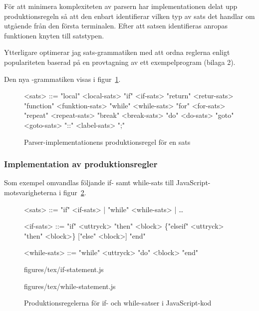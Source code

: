 För att minimera komplexiteten av parsern har implementationen delat upp
produktionsregeln  så att den enbart identifierar vilken typ av
sats det handlar om utgående från den första terminalen. Efter att satsen
identifieras anropas funktionen knyten till satstypen.

Ytterligare optimerar jag sats-grammatiken med att ordna reglerna enligt
populariteten baserad på en provtagning av ett exempelprogram (bilaga 2).

Den nya -grammatiken visas i figur~\ref{fig:stat}.

\begin{figure}[ht]
  \setlength{\grammarindent}{5em}
  \begin{grammar}
    \singlespace\small%
    \selectfont
    <sats> ::= "local" <local-sats>
      \alt "if" <if-sats>
      \alt "return" <retur-sats>
      \alt "function" <funktion-sats>
      \alt "while" <while-sats>
      \alt "for" <for-sats>
      \alt "repeat" <repeat-sats>
      \alt "break" <break-sats>
      \alt "do" <do-sats>
      \alt "goto" <goto-sats>
      \alt "::" <label-sats>
      \alt ";"
  \end{grammar}
  \caption{Parser-implementationens produktionsregel för en sats}
  \label{fig:stat}
\end{figure}

\subsubsection{Implementation av produktionsregler}

Som exempel omvandlas följande if- samt while-sats till
JavaScript-motsvarigheterna i figur~\ref{fig:ifstat}.

\begin{figure}
  \setlength{\grammarindent}{3em}
  \begin{grammar}
    \singlespace\small%
    \selectfont
      <sats> ::= "if" <if-sats> | "while" <while-sats> | \ldots

      <if-sats> ::= "if" <uttryck> "then" <block> \{"elseif" <uttryck> "then" <block>\}
      ["else" <block>] "end"

      <while-sats> ::= "while" <uttryck> "do" <block> "end"
  \end{grammar}
  \begin{minipage}[t]{0.5\textwidth}
    {figures/tex/if-statement.js}
  \end{minipage}
  \begin{minipage}[t]{0.5\textwidth}
    {figures/tex/while-statement.js}
  \end{minipage}
  \caption{Produktionsregelerna för if- och while-satser i JavaScript-kod}
  \label{fig:ifstat}
\end{figure}

